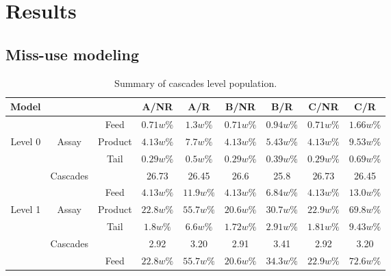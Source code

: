 \section{Results}

\subsection{Miss-use modeling}

\begin{table}[h!]
\centering
  \caption{Summary of cascades level population.}
\begin{tabular}{ccccccccc}
\toprule

Model       &        &           & A/NR      & A/R       & B/NR      & B/R      & C/NR       & C/R          \\
\midrule                                                                                                 
        &            & Feed      & $0.71w\%$ & $1.3w\%$  & $0.71w\%$ & $0.94w\%$ & $0.71w\%$ & $1.66w\%$ \\
Level 0 & Assay      & Product   & $4.13w\%$ & $7.7w\%$  & $4.13w\%$ & $5.43w\%$ & $4.13w\%$ & $9.53w\%$ \\
        &            & Tail      & $0.29w\%$ & $0.5w\%$  & $0.29w\%$ & $0.39w\%$ & $0.29w\%$ & $0.69w\%$  \\
        & Cascades   &           & 26.73     & 26.45     & 26.6      & 25.8      & 26.73     & 26.45      \\
\midrule                                                                                                 
        &            & Feed      & $4.13w\%$ & $11.9w\%$ & $4.13w\%$ & $6.84w\%$ & $4.13w\%$ & $13.0w\%$ \\
Level 1 & Assay      & Product   & $22.8w\%$ & $55.7w\%$ & $20.6w\%$ & $30.7w\%$ & $22.9w\%$ & $69.8w\%$ \\
        &            & Tail      & $1.8w\%$  & $6.6w\%$  & $1.72w\%$ & $2.91w\%$ & $1.81w\%$ & $9.43w\%$  \\
        & Cascades   &           & 2.92       & 3.20      & 2.91      & 3.41     & 2.92      & 3.20       \\
\midrule                                                                                                 
        &            & Feed      & $22.8w\%$ & $55.7w\%$ & $20.6w\%$ & $34.3w\%$ & $22.9w\%$ & $72.6w\%$ \\

\end{tabular}
\end{table}
